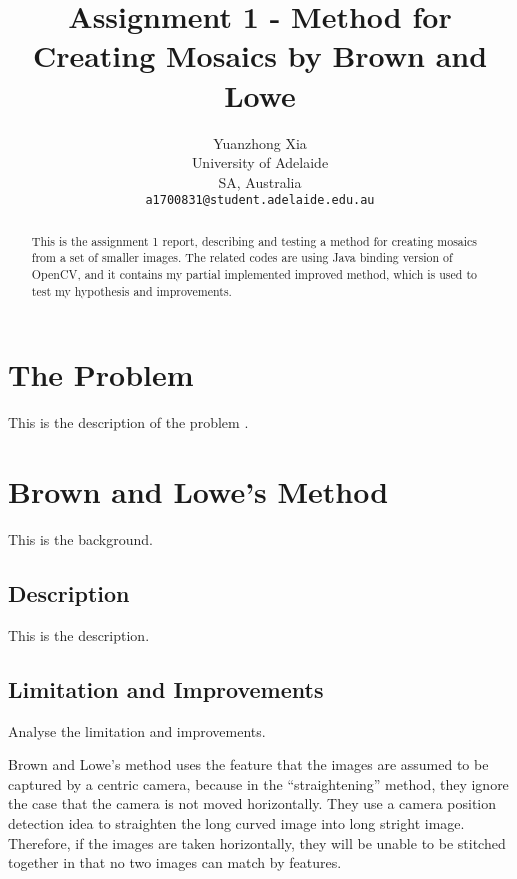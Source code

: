 \documentclass[10pt,twocolumn,letterpaper]{article}
\begin{document}
\title{Assignment 1 - Method for Creating Mosaics by Brown and Lowe}
\author{Yuanzhong Xia\\
University of Adelaide\\
SA, Australia\\
{\tt\small a1700831@student.adelaide.edu.au}
}
\maketitle

\begin{abstract}
This is the assignment 1 report, describing and testing a method for creating mosaics from a set of smaller images.
The related codes are using Java binding version of OpenCV, and it contains my partial implemented improved method, which is used to test my hypothesis and improvements.
\end{abstract}


\section{The Problem}
This is the description of the problem \cite{origin}.


\section{Brown and Lowe's Method}
This is the background.

\subsection{Description}
This is the description.

\subsection{Limitation and Improvements}
Analyse the limitation and improvements.

Brown and Lowe's method uses the feature that the images are assumed to be captured by a centric camera,
because in the ``straightening'' method, they ignore the case that the camera is not moved horizontally.
They use a camera position detection idea to straighten the long curved image into long stright image.
Therefore, if the images are taken horizontally, they will be unable to be stitched together in that no two images can match by features.

\end{document}
